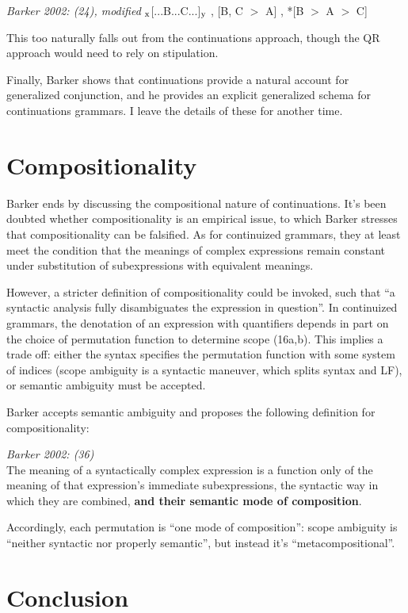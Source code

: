 \documentclass[11pt]{article}
\newcommand*{\textsub}[1]{\ensuremath{_\textrm{{\scriptsize #1}}}}
\begin{document}
\pex \textit{Barker 2002: (24), modified}
\a [...A...]\textsub{x}[...B...C...]\textsub{y}
\a [A $>$ B, C], [B, C $>$ A]
\a *[C $>$ A $>$ B], *[B $>$ A $>$ C]
\xe

\noindent This too naturally falls out from the continuations approach, though the QR approach would need to rely on stipulation.

Finally, Barker shows that continuations provide a natural account for generalized conjunction, and he provides an explicit generalized schema for continuations grammars. I leave the details of these for another time.

\section{Compositionality}

Barker ends by discussing the compositional nature of continuations. It's been doubted whether compositionality is an empirical issue, to which Barker stresses that compositionality can be falsified. As for continuized grammars, they at least meet the condition that the meanings of complex expressions remain constant under substitution of subexpressions with equivalent meanings. 

However, a stricter definition of compositionality could be invoked, such that ``a syntactic analysis fully disambiguates the expression in question''. In continuized grammars, the denotation of an expression with quantifiers depends in part on the choice of permutation function to determine scope (16a,b). This implies a trade off: either the syntax specifies the permutation function with some system of indices (scope ambiguity is a syntactic maneuver, which splits syntax and LF), or semantic ambiguity must be accepted.

Barker accepts semantic ambiguity and proposes the following definition for compositionality:

    \ex \textit{Barker 2002: (36)} \\ The meaning of a syntactically complex expression is a function only of the meaning of that expression's immediate subexpressions, the syntactic way in which they are combined, \textbf{and their semantic mode of composition}.
    \xe

\noindent Accordingly, each permutation is ``one mode of composition'': scope ambiguity is ``neither syntactic nor properly semantic'', but instead it's ``metacompositional''.

\section{Conclusion}
\end{document}
